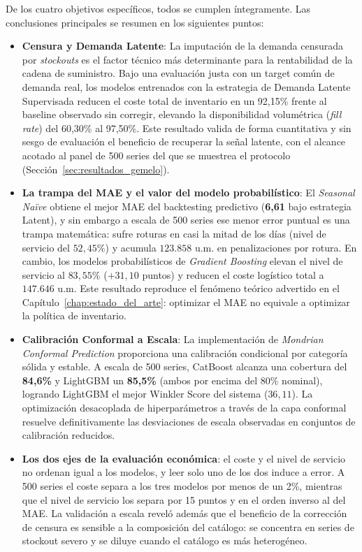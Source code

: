 De los cuatro objetivos específicos, todos se cumplen íntegramente. Las conclusiones principales se resumen en los siguientes puntos:

\begin{itemize}
    \item \textbf{Censura y Demanda Latente}: La imputación de la demanda censurada por \textit{stockouts} es el factor técnico más determinante para la rentabilidad de la cadena de suministro. Bajo una evaluación justa con un target común de demanda real, los modelos entrenados con la estrategia de Demanda Latente Supervisada reducen el coste total de inventario en un 92{,}15\% frente al baseline observado sin corregir, elevando la disponibilidad volumétrica (\textit{fill rate}) del 60{,}30\% al 97{,}50\%. Este resultado valida de forma cuantitativa y sin sesgo de evaluación el beneficio de recuperar la señal latente, con el alcance acotado al panel de 500 series del que se muestrea el protocolo (Sección~\ref{sec:resultados_gemelo}).

    \item \textbf{La trampa del MAE y el valor del modelo probabilístico}: El \textit{Seasonal Naïve} obtiene el mejor MAE del backtesting predictivo (\textbf{6,61} bajo estrategia Latent), y sin embargo a escala de 500 series ese menor error puntual es una trampa matemática: sufre roturas en casi la mitad de los días (nivel de servicio del $52{,}45\%$) y acumula $123.858$ u.m. en penalizaciones por rotura. En cambio, los modelos probabilísticos de \textit{Gradient Boosting} elevan el nivel de servicio al $83{,}55\%$ ($+31{,}10$ puntos) y reducen el coste logístico total a $147.646$ u.m. Este resultado reproduce el fenómeno teórico advertido en el Capítulo~\ref{chap:estado_del_arte}: optimizar el MAE no equivale a optimizar la política de inventario.

    \item \textbf{Calibración Conformal a Escala}: La implementación de \textit{Mondrian Conformal Prediction} proporciona una calibración condicional por categoría sólida y estable. A escala de 500 series, CatBoost alcanza una cobertura del \textbf{84{,}6\%} y LightGBM un \textbf{85{,}5\%} (ambos por encima del $80\%$ nominal), logrando LightGBM el mejor Winkler Score del sistema ($36{,}11$). La optimización desacoplada de hiperparámetros a través de la capa conformal resuelve definitivamente las desviaciones de escala observadas en conjuntos de calibración reducidos.

    \item \textbf{Los dos ejes de la evaluación económica}: el coste y el nivel de servicio no ordenan igual a los modelos, y leer solo uno de los dos induce a error. A 500 series el coste separa a los tres modelos por menos de un 2\%, mientras que el nivel de servicio los separa por 15 puntos y en el orden inverso al del MAE. La validación a escala reveló además que el beneficio de la corrección de censura es sensible a la composición del catálogo: se concentra en series de stockout severo y se diluye cuando el catálogo es más heterogéneo.



\end{itemize}
